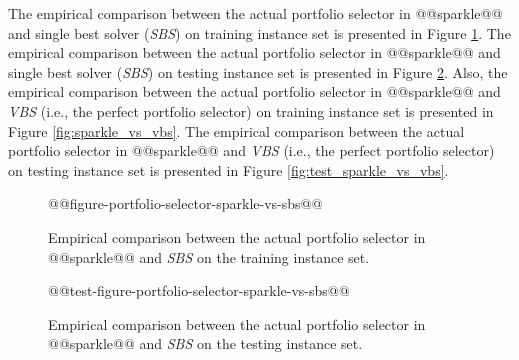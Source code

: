 \documentclass[british]{article}
\begin{document}
The empirical comparison between the actual portfolio selector in @@sparkle@@ and single best solver (\emph{SBS}) on training instance set is presented in Figure \ref{fig:sparkle_vs_sbs}. The empirical comparison between the actual portfolio selector in @@sparkle@@ and single best solver (\emph{SBS}) on testing instance set is presented in Figure \ref{fig:test_sparkle_vs_sbs}. Also, the empirical comparison between the actual portfolio selector in @@sparkle@@ and \emph{VBS} (i.e., the perfect portfolio selector) on training instance set is presented in Figure \ref{fig:sparkle_vs_vbs}. The empirical comparison between the actual portfolio selector in @@sparkle@@ and \emph{VBS} (i.e., the perfect portfolio selector) on testing instance set is presented in Figure \ref{fig:test_sparkle_vs_vbs}.


%

\begin{figure}[t]
\noindent \begin{centering}
@@figure-portfolio-selector-sparkle-vs-sbs@@
\par\end{centering}

\caption{Empirical comparison between the actual portfolio selector in @@sparkle@@ and \emph{SBS} on the training instance set.}\label{fig:sparkle_vs_sbs}
\end{figure}

\begin{figure}[t]
\noindent \begin{centering}
@@test-figure-portfolio-selector-sparkle-vs-sbs@@
\par\end{centering}

\caption{Empirical comparison between the actual portfolio selector in @@sparkle@@ and \emph{SBS} on the testing instance set.}\label{fig:test_sparkle_vs_sbs}
\end{figure}
\end{document}
